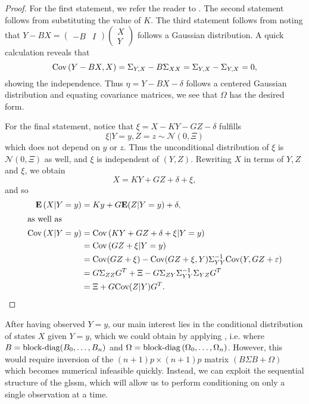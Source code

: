 \begin{proof}
    For the first statement, we refer the reader to \citep[Chapter 4, Lemma 1]{Durbin2012Time}. The second statement follows from substituting the value of $K$. The third statement follows from noting that $Y-BX = \begin{pmatrix}
        -B & I
    \end{pmatrix} \begin{pmatrix}
        X \\ Y
    \end{pmatrix}$ follows a Gaussian distribution. A quick calculation reveals that $$\text{Cov} \left( Y- BX, X \right) = \Sigma_{Y,X} - B \Sigma_{XX} = \Sigma_{Y,X} - \Sigma_{Y,X} = 0,$$
    showing the independence. Thus $\eta = Y - BX - \delta$ follows a centered Gaussian distribution and equating covariance matrices, we see that $\Omega$ has the desired form.

    For the final statement, notice that $\xi = X - KY - GZ - \delta$ fulfills 
    $$
    \xi | Y = y, Z = z \sim \mathcal N(0, \Xi)
    $$
    which does not depend on $y$ or $z$. Thus the unconditional distribution of $\xi$ is $\mathcal N(0, \Xi)$ as well, and $\xi$ is independent of $(Y, Z)$. Rewriting $X$ in terms of $Y,Z$ and $\xi$, we obtain 
    $$
    X = KY + GZ + \delta + \xi,
    $$
    and so
    \begin{align*}
        \mathbf E \left( X | Y = y \right) &= Ky + G \mathbf E (Z| Y = y) + \delta,\\
        \intertext{as well as}
        \text{Cov} \left( X | Y = y \right) &= \text{Cov} \left(KY + GZ+\delta +\xi|  Y = y\right) \\
            &= \text{Cov} \left( GZ + \xi | Y = y  \right) \\
            &= \text{Cov} (GZ + \xi) - \text{Cov}(GZ + \xi, Y) \Sigma_{YY}^{-1} \text{Cov} (Y, GZ + \varepsilon)\\
            &= G \Sigma_{ZZ}G^{T} + \Xi - G \Sigma_{ZY}\Sigma_{YY}^{-1}\Sigma_{YZ}G^{T}\\
            &= \Xi + G \text{Cov}(Z|Y) G^{T}.
    \end{align*}
\end{proof}

After having observed $Y = y$, our main interest lies in the conditional distribution of states $X$ given $Y= y$, which we could obtain by applying , i.e. where $B = \operatorname{block-diag} (B_{0}, \dots, B_{n})$ and $\Omega = \operatorname{block-diag} \left( \Omega_{0}, \dots, \Omega_{n} \right)$. However, this would require inversion of the $(n+1)p\times(n+1)p$ matrix $\left( B\Sigma B + \Omega \right)$ which becomes numerical infeasible quickly. Instead, we can exploit the sequential structure of the \acrshort{glssm}, which will allow us to perform conditioning on only a single observation at a time. 

